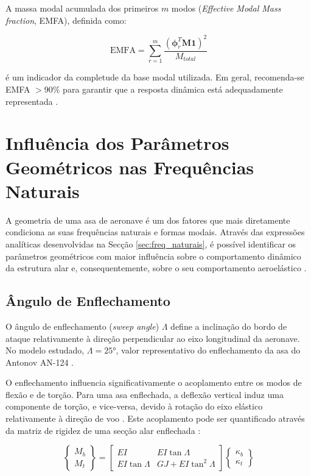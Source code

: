\documentclass[11pt,oneside,a4paper,final]{report}
\begin{document}
A massa modal acumulada dos primeiros $m$ modos (\textit{Effective Modal Mass fraction}, EMFA), definida como:

\begin{equation}
    \text{EMFA} = \sum_{r=1}^{m} 
    \frac{\left( \boldsymbol{\phi}_r^T \mathbf{M} 
    \mathbf{1} \right)^2}{M_{total}}
    \label{eq:emf}
\end{equation}

\noindent é um indicador da completude da base modal utilizada. Em geral, recomenda-se EMFA $> 90\%$ para garantir que a resposta dinâmica está adequadamente representada \cite{Craig2006, Nastran2014}.

\section{Influência dos Parâmetros Geométricos nas 
Frequências Naturais}
\label{sec:efeitos_geometricos}

A geometria de uma asa de aeronave é um dos fatores que mais diretamente condiciona as suas frequências naturais e formas modais. Através das expressões analíticas desenvolvidas na Secção \ref{sec:freq_naturais}, é possível identificar os parâmetros geométricos com maior influência sobre o comportamento dinâmico da estrutura alar e, consequentemente, sobre o seu comportamento aeroelástico \cite{Bisplinghoff1996, Wright2015}.

\subsection{Ângulo de Enflechamento}
\label{sec:sweep}

O ângulo de enflechamento (\textit{sweep angle}) $\Lambda$ define a inclinação do bordo de ataque relativamente à direção perpendicular ao eixo longitudinal da aeronave. No modelo estudado, $\Lambda = \ang{25}$, valor representativo do enflechamento da asa do Antonov AN-124 \cite{Antonov2004}.

O enflechamento influencia significativamente o acoplamento entre os modos de flexão e de torção. Para uma asa enflechada, a deflexão vertical induz uma componente de torção, e vice-versa, devido à rotação do eixo elástico relativamente à direção de voo \cite{Dowell2004}. Este acoplamento pode ser quantificado através da matriz de rigidez de uma secção alar enflechada \cite{Hodges2011}:

\begin{equation}
    \begin{Bmatrix} M_b \\ M_t \end{Bmatrix} =
    \begin{bmatrix} 
        EI & EI\tan\Lambda \\ 
        EI\tan\Lambda & GJ + EI\tan^2\Lambda 
    \end{bmatrix}
    \begin{Bmatrix} \kappa_b \\ \kappa_t 
    \end{Bmatrix}
    \label{eq:rigidez_enflechamento}
\end{equation}
\end{document}
